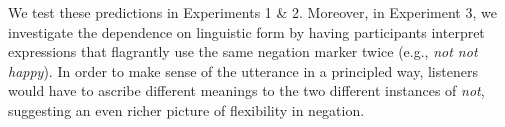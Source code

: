 \documentclass[floatsintext,doc]{apa6}
\newcommand{\ourmodel}{Flexible Negation\xspace}
\begin{document}

We test these predictions in Experiments 1 \& 2.
Moreover, in Experiment 3, we investigate the dependence on linguistic form by having participants interpret expressions that flagrantly use the same negation marker twice (e.g., \emph{not not happy}).
In order to make sense of the utterance in a principled way, listeners would have to ascribe different meanings to the two different instances of \emph{not}, suggesting an even richer picture of flexibility in negation.  %
\end{document}

